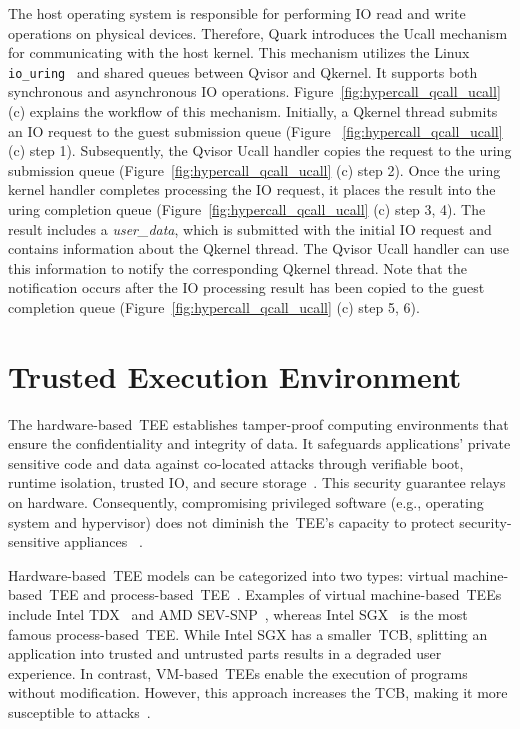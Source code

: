 The host operating system is responsible for performing IO read and write operations on physical devices. Therefore, Quark introduces the Ucall mechanism for communicating with the host kernel. This mechanism utilizes the Linux \texttt{io\_uring}~\cite*{io_uring} and shared queues between 
Qvisor and Qkernel. It supports both synchronous and asynchronous IO operations. Figure~\ref{fig:hypercall_qcall_ucall} (c) explains the workflow of this mechanism. Initially, a Qkernel thread submits an IO request to the guest submission queue (Figure ~\ref{fig:hypercall_qcall_ucall} (c) step 1). 
Subsequently, the Qvisor Ucall handler copies the request to the uring submission queue (Figure~\ref{fig:hypercall_qcall_ucall} (c) step 2). Once the uring kernel handler completes processing the IO request, it places the result into the uring completion 
queue (Figure~\ref{fig:hypercall_qcall_ucall} (c) step 3, 4). The result includes a \emph{user\_data}, which is submitted with the initial IO request and contains information about the Qkernel thread. The Qvisor Ucall handler can use this information to notify the corresponding Qkernel thread. 
Note that the notification occurs after the IO processing result has been copied to the guest completion queue (Figure~\ref{fig:hypercall_qcall_ucall} (c) step 5, 6).

\section{Trusted Execution Environment}

The hardware-based~\acrshort{TEE} establishes tamper-proof computing environments that ensure the confidentiality and integrity of data. It safeguards applications' private sensitive code and data against co-located attacks through verifiable boot, runtime isolation, trusted IO, and 
secure storage~\cite*{Hardware-supported-TEE}. This security guarantee relays on hardware. Consequently, compromising privileged software (e.g., operating system and hypervisor) does not diminish the~\acrshort{TEE}'s capacity to protect security-sensitive appliances ~\cite*{7345265}.


Hardware-based~\acrshort{TEE} models can be categorized into two types: virtual machine-based~\acrshort{TEE} and process-based~\acrshort{TEE}~\cite*{10.3389/fcomp.2022.930741}. Examples of virtual machine-based~\acrshort{TEE}s include Intel TDX~\cite*{Intel_tdx_whitepaper} and AMD SEV-SNP~\cite*{SEV_SNP_white_book}, whereas 
Intel SGX~\cite*{INTEL_SGX} is the most famous process-based~\acrshort{TEE}. While Intel SGX has a smaller~\acrshort{TCB}, splitting an application into trusted and untrusted parts results in a degraded user experience. In contrast, VM-based~\acrshort{TEE}s enable the execution of programs without modification. However, this approach increases the 
\acrshort{TCB}, making it more susceptible to attacks~\cite*{Execution_Environment_landscape}.

